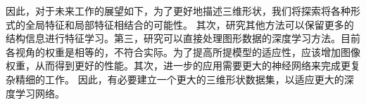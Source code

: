 因此，对于未来工作的展望如下，为了更好地描述三维形状，我们将探索将各种形式的全局特征和局部特征相结合的可能性。 其次，研究其他方法可以保留更多的结构信息进行特征学习。第三，研究可以直接处理图形数据的深度学习方法。目前各视角的权重是相等的，不符合实际。为了提高所提模型的适应性，应该增加图像权重，从而得到更好的性能。其次，进一步的应用需要更大的神经网络来完成更复杂精细的工作。 因此，有必要建立一个更大的三维形状数据集，以适应更大的深度学习网络。 

